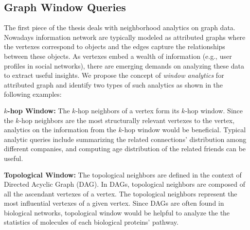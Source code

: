 \subsection{Graph Window Queries}
The first piece of the thesis deals with neighborhood analytics
on graph data. Nowadays information network are typically
modeled as attributed graphs where the 
vertexes correspond to objects and the edges capture the
relationships between these objects. As vertexes embed a wealth
of information (e.g., user profiles in social networks), there are 
emerging demands on analyzing these data to extract useful insights. 
We propose the concept of \emph{window analytics} 
for attributed graph and identify two types of such analytics as shown in the following examples:

\textbf{$k$-hop Window:} The $k$-hop neighbors of a vertex form
its $k$-hop window. Since the $k$-hop neighbors are the most structurally
relevant vertexes to the vertex, analytics on the information from the $k$-hop window
would be beneficial. Typical analytic queries include summarizing the related connections' distribution among different companies, and computing age distribution of the related friends can be useful.

\textbf{Topological Window:} The topological neighbors are defined
in the context of Directed Acyclic Graph (DAG). In DAGs,
topological neighbors are composed of all the ascendant vertexes of a vertex. 
The topological neighbors represent the most influential vertexes of a given vertex.
Since DAGs are often found in biological networks, topological window would
be helpful to analyze the the statistics of molecules of each biological proteins' pathway.

